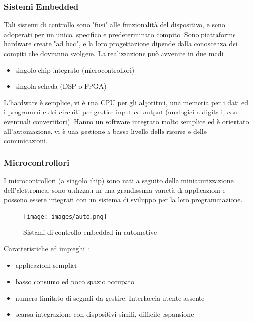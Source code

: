 \documentclass[10pt, letterpaper]{report}
\begin{document}
\subsubsection{Sistemi Embedded}
Tali sistemi di controllo sono "fusi" alle funzionalità del dispositivo, e sono adoperati per un unico, specifico e 
predeterminato compito. Sono piattaforme hardware create "ad hoc", e la loro progettazione dipende dalla conoscenza dei 
compiti che dovranno svolgere. La realizzazione può avvenire in due modi \begin{itemize}
    \item singolo chip integrato (microcontrollori)
    \item singola scheda (DSP o FPGA)
\end{itemize}
L'hardware è semplice, vi è una CPU per gli algoritmi, una memoria per i dati ed i programmi e dei circuiti per 
gestire input ed output (analogici o digitali, con eventuali convertitori). Hanno un software integrato molto 
semplice ed è orientato all'automazione, vi è una gestione a basso livello delle risorse e delle comunicazioni.
\subsubsection{Microcontrollori}
I microcontrollori (a singolo chip) sono nati a seguito della miniaturizzazione dell'elettronica, sono 
utilizzati in una grandissima varietà di applicazioni e possono essere integrati con un sistema di sviluppo 
per la loro programmazione.\begin{figure}[h!]
    \centering
    \texttt{[image: images/auto.png]}
    \caption{Sistemi di controllo embedded in automotive}
\end{figure}\acc
Caratteristiche ed impieghi : \begin{itemize}
    \item applicazioni semplici 
    \item basso consumo ed poco spazio occupato 
    \item numero limitato di segnali da gestire. Interfaccia utente assente 
    \item scarsa integrazione con dispositivi simili, difficile espansione
\end{itemize}
\end{document}
